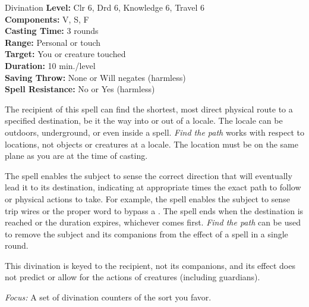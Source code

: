{Divination}
{
	\textbf{Level:}
	Clr 6, Drd 6, Knowledge 6, Travel 6\\
	\textbf{Components:}
	V, S, F\\
	\textbf{Casting Time:}
	3 rounds\\
	\textbf{Range:}
	Personal or touch\\
	\textbf{Target:}
	You or creature touched\\
	\textbf{Duration:}
	10 min./level\\
	\textbf{Saving Throw:}
	None or Will negates (harmless)\\
	\textbf{Spell Resistance:}
	No or Yes (harmless)\\
}
{
	The recipient of this spell can find the shortest, most direct physical route to a specified destination, be it the way into or out of a locale. The locale can be outdoors, underground, or even inside a  spell. \emph{Find the path} works with respect to locations, not objects or creatures at a locale. The location must be on the same plane as you are at the time of casting.

	The spell enables the subject to sense the correct direction that will eventually lead it to its destination, indicating at appropriate times the exact path to follow or physical actions to take. For example, the spell enables the subject to sense trip wires or the proper word to bypass a . The spell ends when the destination is reached or the duration expires, whichever comes first. \emph{Find the path} can be used to remove the subject and its companions from the effect of a  spell in a single round.

	This divination is keyed to the recipient, not its companions, and its effect does not predict or allow for the actions of creatures (including guardians).

	\textit{Focus:}
	A set of divination counters of the sort you favor.

}
